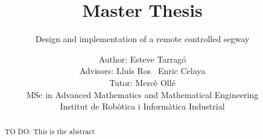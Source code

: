 \documentclass{scrartcl}
\title{Master Thesis}
\subtitle{Design and implementation of a remote controlled segway}
\author{Author: Esteve Tarrag\'o \\
	Advisors: Llu\'is Ros \ Enric Celaya\\
	Tutor: Merc\`e Oll\'e\\
	MSc in Advanced Mathematics and Mathematical Engineering\\
	Institut de Robòtica i Informàtica Industrial
}
\begin{document}
\maketitle

\newpage
\begin{abstract}
	TO DO: This is the abstract
\end{abstract}

\newpage
\tableofcontents




\end{document}
